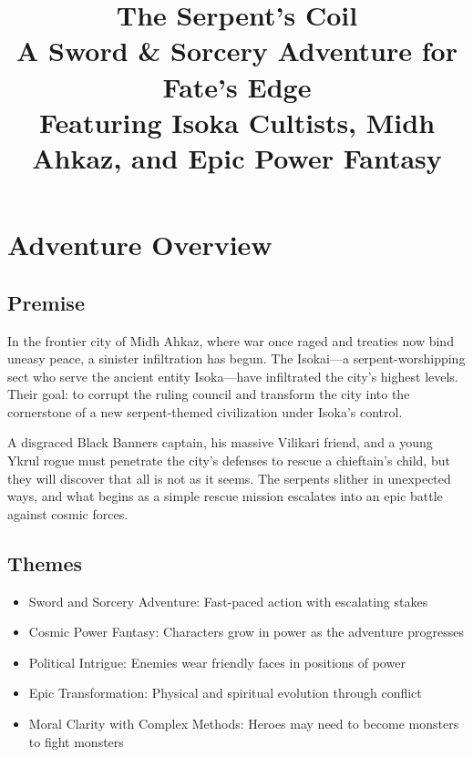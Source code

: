 \documentclass[12pt,twoside]{article}
\title{
  \textbf{\Huge The Serpent's Coil} \\
  \Large A Sword \& Sorcery Adventure for Fate's Edge \\
  \vspace{1cm}
  \large Featuring Isoka Cultists, Midh Ahkaz, and Epic Power Fantasy
}
\author{}
\date{}
\begin{document}
\maketitle
\thispagestyle{empty}

\newpage
\setcounter{page}{1}

\tableofcontents
\newpage

\section{Adventure Overview}

\subsection{Premise}

In the frontier city of Midh Ahkaz, where war once raged and treaties now bind uneasy peace, a sinister infiltration has begun. The Isokai—a serpent-worshipping sect who serve the ancient entity Isoka—have infiltrated the city's highest levels. Their goal: to corrupt the ruling council and transform the city into the cornerstone of a new serpent-themed civilization under Isoka's control.

A disgraced Black Banners captain, his massive Vilikari friend, and a young Ykrul rogue must penetrate the city's defenses to rescue a chieftain's child, but they will discover that all is not as it seems. The serpents slither in unexpected ways, and what begins as a simple rescue mission escalates into an epic battle against cosmic forces.

\subsection{Themes}

\begin{itemize}
  \item Sword and Sorcery Adventure: Fast-paced action with escalating stakes
  \item Cosmic Power Fantasy: Characters grow in power as the adventure progresses
  \item Political Intrigue: Enemies wear friendly faces in positions of power
  \item Epic Transformation: Physical and spiritual evolution through conflict
  \item Moral Clarity with Complex Methods: Heroes may need to become monsters to fight monsters
\end{itemize}
\end{document}
